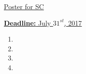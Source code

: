 \underline{Poster for SC} 


\underline{\textbf{Deadline:} July $31^{st}$, 2017}
\begin{enumerate} 
\item 
\item
\item 
\item 
\end{enumerate}
